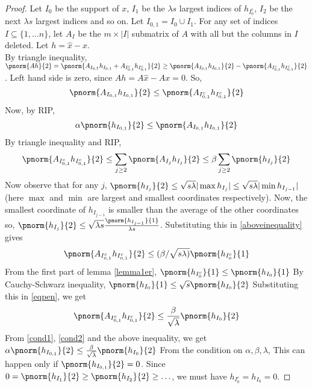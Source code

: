 \begin{proof}
	Let $I_0$ be the support of $x$,
	$I_1$ be the $\lambda s$ largest indices of $h_{I_0^c}$,
	$I_2$ be the next $\lambda s$ largest indices and so on.
	Let $I_{0,1} = I_0 \cup I_1$. For any set of indices
	$I\subseteq \{1,\ldots n\}$, let $A_I$ be the $m\times |I|$
	submatrix of $A$ with all but the columns in $I$ deleted.
	Let $h = \hat{x}-x$.\\
	By triangle inequality,
$	
		\pnorm{Ah}{2} = \pnorm{A_{I_{0,1}}h_{I_{0,1}} + A_{I_{0,1}^c}h_{I_{0,1}^c}}{2}\geq \pnorm{A_{I_{0,1}}h_{I_{0,1}}}{2} - \pnorm{A_{I_{0,1}^c}h_{I_{0,1}^c}}{2}
$.
Left hand side is zero, since $Ah = A\hat{x} - Ax = 0$.
So,
	\begin{equation}\label{cond1}
		\pnorm{A_{I_{0,1}}h_{I_{0,1}}}{2}\leq \pnorm{A_{I_{0,1}^c}h_{I_{0,1}^c}}{2} 
	\end{equation}
Now, by RIP,
	 \begin{equation}\label{cond2}
		 \alpha \pnorm{h_{I_{0,1}}}{2}\leq \pnorm{A_{I_{0,1}}h_{I_{0,1}}}{2}
	 \end{equation}
By triangle inequality and RIP,
		\begin{equation}\label{aboveinequality}
            \pnorm{A_{I_{0,1}^c}h_{I_{0,1}^c}}{2} 
			\leq  \sum_{j\geq 2} \pnorm{A_{I_j}h_{I_j}}{2}
            \leq \beta\sum_{j\geq 2}\pnorm{h_{I_j}}{2}
        \end{equation}
Now observe that for any $j$,
$
		\pnorm{h_{I_j}}{2}\leq \sqrt{s\lambda}|\max{h_{I_j}}| \leq \sqrt{s\lambda}|\min h_{I_{j-1}}|
	$ (here $\max$ and $\min$ are largest and smallest coordinates
	respectively).
Now, the smallest coordinate of $h_{I_{j-1}}$ is smaller than the average of the other coordinates so,
        $
		\pnorm{h_{I_j}}{2}\leq \sqrt{\lambda s}\frac{\pnorm{h_{I_{j-1}}}{1}}{{\lambda s}}
        $.
	Substituting this in \eqref{aboveinequality} gives
        \begin{equation}\label{eqpen}
			\pnorm{A_{I_{0,1}^c}h_{I_{0,1}^c}}{2}\leq (\beta/\sqrt{s\lambda)}\pnorm{h_{I_0^c}}{1}
        \end{equation}
    From the first part of lemma \ref{lemma1er}, $\pnorm{h_{I_0^c}}{1}\leq \pnorm{h_{I_0}}{1}$
    By Cauchy-Schwarz inequality, $\pnorm{h_{I_0}}{1}\leq \sqrt{s}\pnorm{h_{I_0}}{2}$
    Substituting this in \eqref{eqpen}, we get
    \[
        \pnorm{A_{I_{0,1}^c}h_{I_{0,1}^c}}{2}\leq \frac{\beta}{\sqrt{\lambda}}\pnorm{h_{I_0}}{2}
    \]
    From \eqref{cond1}, \eqref{cond2} and the above inequality, we get
    $
        \alpha \pnorm{h_{I_{0,1}}}{2} \leq \frac{\beta}{\sqrt{\lambda}} \pnorm{h_{I_{0}}}{2}
    $
    From the condition on $\alpha,\beta, \lambda$, This can happen only if $\pnorm{h_{I_{0,1}}}{2} = 0$.
    Since $0 = \pnorm{h_{I_1}}{2}\geq \pnorm{h_{I_2}}{2}\geq \ldots$, we must have $h_{I_0^c} = h_{I_0} = 0$.
\end{proof}

